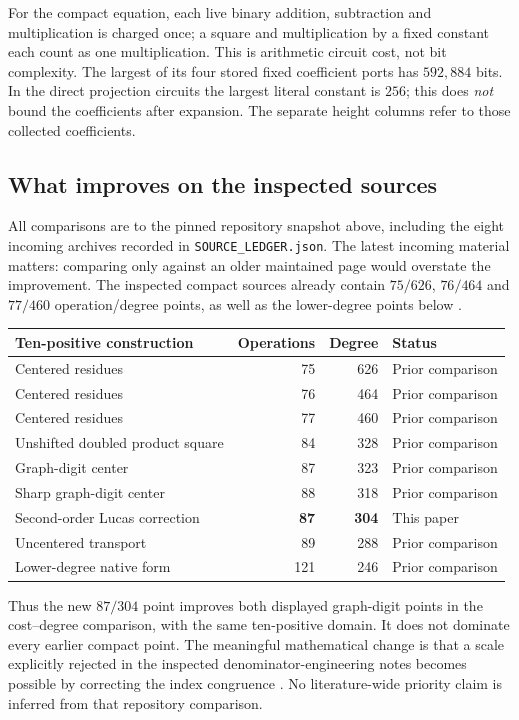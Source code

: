 \documentclass[11pt,letterpaper]{article}
\theoremstyle{definition}
\theoremstyle{remark}
\begin{document}
For the compact equation, each live binary addition, subtraction and
multiplication is charged once; a square and multiplication by a fixed
constant each count as one multiplication.  This is arithmetic circuit cost,
not bit complexity.  The largest of its four stored fixed coefficient ports
has $592{,}884$ bits.  In the direct projection circuits the largest literal
constant is $256$; this does \emph{not} bound the coefficients after expansion.
The separate height columns refer to those collected coefficients.

\subsection{What improves on the inspected sources}

All comparisons are to the pinned repository snapshot above, including the
eight incoming archives recorded in \texttt{SOURCE\_LEDGER.json}.
The latest incoming material matters: comparing only against an older
maintained page would overstate the improvement.  The inspected compact
sources already contain $75/626$, $76/464$ and $77/460$ operation/degree
points, as well as the lower-degree points below
\cite{centered,review,graphdigits,forms}.

\begin{center}
\begin{tabular}{@{}lrrl@{}}
\toprule
Ten-positive construction & Operations & Degree & Status\\
\midrule
Centered residues & 75 & 626 & Prior comparison\\
Centered residues & 76 & 464 & Prior comparison\\
Centered residues & 77 & 460 & Prior comparison\\
Unshifted doubled product square & 84 & 328 & Prior comparison\\
Graph-digit center & 87 & 323 & Prior comparison\\
Sharp graph-digit center & 88 & 318 & Prior comparison\\
Second-order Lucas correction & \textbf{87} & \textbf{304} & This paper\\
Uncentered transport & 89 & 288 & Prior comparison\\
Lower-degree native form & 121 & 246 & Prior comparison\\
\bottomrule
\end{tabular}
\end{center}

Thus the new $87/304$ point improves both displayed graph-digit points in
the cost--degree comparison, with the same ten-positive domain.  It does not
dominate every earlier compact point.  The meaningful mathematical change
is that a scale explicitly rejected in the inspected denominator-engineering
notes becomes possible by correcting the index congruence
\cite{denominator}.  No literature-wide priority claim is inferred from that
repository comparison.
\end{document}
